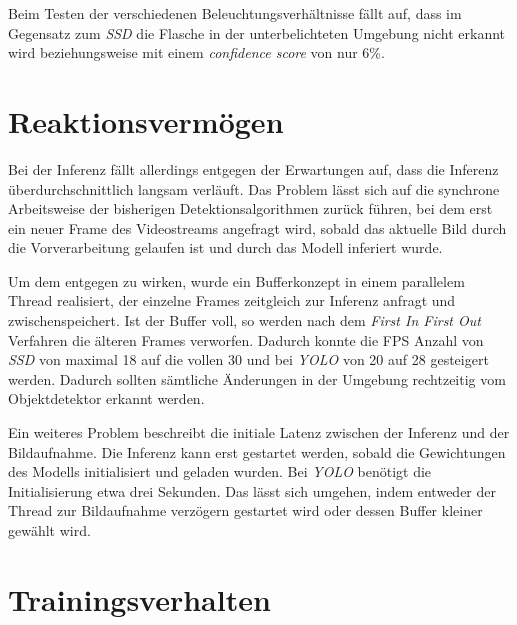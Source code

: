 
Beim Testen der verschiedenen Beleuchtungsverhältnisse fällt auf, dass im Gegensatz zum \textit{SSD} die Flasche in der unterbelichteten Umgebung nicht erkannt wird beziehungsweise mit einem \textit{confidence score} von nur 6\%. 
 
\section{Reaktionsvermögen}

Bei der Inferenz fällt allerdings entgegen der Erwartungen auf, dass die Inferenz überdurchschnittlich langsam verläuft. Das Problem lässt sich auf die synchrone Arbeitsweise der bisherigen Detektionsalgorithmen zurück führen, bei dem erst ein neuer Frame des Videostreams angefragt wird, sobald das aktuelle Bild durch die Vorverarbeitung gelaufen ist und durch das Modell inferiert wurde. 

Um dem entgegen zu wirken, wurde ein Bufferkonzept in einem parallelem Thread realisiert, der einzelne Frames zeitgleich zur Inferenz anfragt und zwischenspeichert. Ist der Buffer voll, so werden nach dem \textit{First In First Out} Verfahren die älteren Frames verworfen. Dadurch konnte die FPS Anzahl von \textit{SSD} von maximal 18 auf die vollen 30 und bei \textit{YOLO} von 20 auf 28 gesteigert werden. Dadurch sollten sämtliche Änderungen in der Umgebung rechtzeitig vom Objektdetektor erkannt werden. 

Ein weiteres Problem beschreibt die initiale Latenz zwischen der Inferenz und der Bildaufnahme. Die Inferenz kann erst gestartet werden, sobald die Gewichtungen des Modells initialisiert und geladen wurden. Bei \textit{YOLO} benötigt die Initialisierung etwa drei Sekunden. Das lässt sich umgehen, indem entweder der Thread zur Bildaufnahme verzögern gestartet wird oder dessen Buffer kleiner gewählt wird.

\section{Trainingsverhalten}

